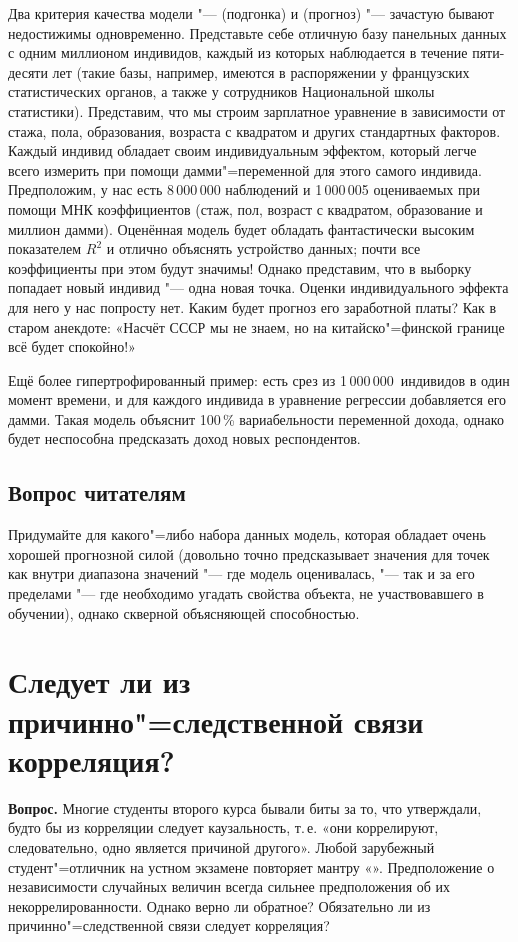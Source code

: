 \documentclass[final,pdftex]{../../template/epsilonj}
\begin{document}
Два критерия качества модели "---  (подгонка) и  (прогноз) "--- зачастую бывают недостижимы одновременно. Представьте себе отличную базу панельных данных с одним миллионом индивидов, каждый из которых наблюдается в течение пяти-десяти лет (такие базы, например, имеются в распоряжении у французских статистических органов, а также у сотрудников Национальной школы статистики). Представим, что мы строим зарплатное уравнение в зависимости от стажа, пола, образования, возраста с квадратом и других стандартных факторов. Каждый индивид обладает своим индивидуальным эффектом, который легче всего измерить при помощи дамми"=переменной для этого самого индивида. Предположим, у нас есть 8\,000\,000 наблюдений и 1\,000\,005 оцениваемых при помощи МНК коэффициентов (стаж, пол, возраст с квадратом, образование и миллион дамми). Оценённая модель будет обладать фантастически высоким показателем $R^2$ и отлично объяснять устройство данных; почти все коэффициенты при этом будут значимы! Однако представим, что в выборку попадает новый индивид "--- одна новая точка. Оценки индивидуального эффекта для него у нас попросту нет. Каким будет прогноз его заработной платы? Как в старом анекдоте: «Насчёт СССР мы не знаем, но на китайско"=финской границе всё будет спокойно!»

Ещё более гипертрофированный пример: есть срез из 1\,000\,000~индивидов в один момент времени, и для каждого индивида в уравнение регрессии добавляется его дамми. Такая модель объяснит 100\,\% вариабельности переменной дохода, однако будет неспособна предсказать доход новых респондентов.

\subsection{Вопрос читателям}

Придумайте для какого"=либо набора данных модель, которая обладает очень хорошей прогнозной силой (довольно точно предсказывает значения для точек как внутри диапазона значений "--- где модель оценивалась, "--- так и за его пределами "--- где необходимо угадать свойства объекта, не участвовавшего в обучении), однако скверной объясняющей способностью.

\section{Следует ли из причинно"=следственной связи корреляция?}

\textbf{Вопрос.} Многие студенты второго курса бывали биты за то, что утверждали, будто бы из корреляции следует каузальность, т.\,е. «они коррелируют, следовательно, одно является причиной другого». Любой зарубежный студент"=отличник на устном экзамене повторяет мантру «». Предположение о независимости случайных величин всегда сильнее предположения об их некоррелированности. Однако верно ли обратное? Обязательно ли из причинно"=следственной связи следует корреляция?
\end{document}
